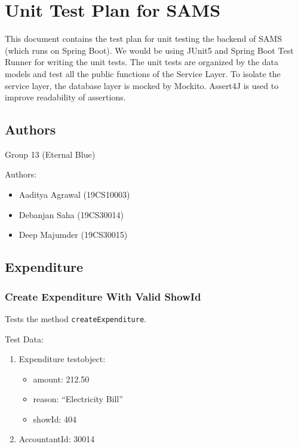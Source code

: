 \documentclass[]{article}
\date{}
\providecommand{\tightlist}{%
  \setlength{\itemsep}{0pt}\setlength{\parskip}{0pt}}
\begin{document}
\hypertarget{unit-test-plan-for-sams}{%
\section{Unit Test Plan for SAMS}\label{unit-test-plan-for-sams}}

This document contains the test plan for unit testing the backend of
SAMS (which runs on Spring Boot). We would be using JUnit5 and Spring
Boot Test Runner for writing the unit tests. The unit tests are
organized by the data models and test all the public functions of the
Service Layer. To isolate the service layer, the database layer is
mocked by Mockito. Assert4J is used to improve readability of
assertions.

\hypertarget{authors}{%
\subsection{Authors}\label{authors}}

Group 13 (Eternal Blue)

Authors:

\begin{itemize}
\tightlist
\item
  Aaditya Agrawal (19CS10003)
\item
  Debanjan Saha (19CS30014)
\item
  Deep Majumder (19CS30015)
\end{itemize}

\hypertarget{expenditure}{%
\subsection{Expenditure}\label{expenditure}}

\hypertarget{create-expenditure-with-valid-showid}{%
\subsubsection{Create Expenditure With Valid
ShowId}\label{create-expenditure-with-valid-showid}}

Tests the method \texttt{createExpenditure}.

Test Data:

\begin{enumerate}
\def\labelenumi{\arabic{enumi}.}
\tightlist
\item
  Expenditure testobject:

  \begin{itemize}
  \tightlist
  \item
    amount: 212.50
  \item
    reason: ``Electricity Bill''
  \item
    showId: 404
  \end{itemize}
\item
  AccountantId: 30014
\end{enumerate}
\end{document}
